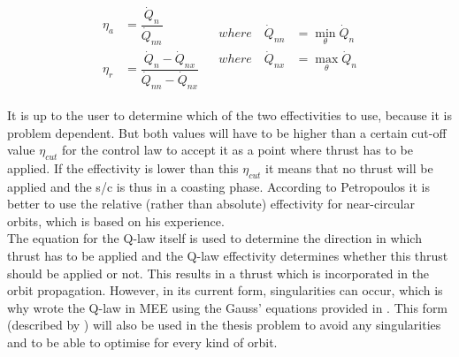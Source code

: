 



\begin{align} \label{eq:effect}
\begin{split} 
\eta_{a}&=\dfrac{\dot{Q}_{n}}{\dot{Q}_{nn}}\\
\eta_{r} &= \dfrac{\dot{Q}_{n}-\dot{Q}_{nx}}{\dot{Q}_{nn}-\dot{Q}_{nx}}
\end{split} 
&
\begin{split}
where \quad \dot{Q}_{nn}&=\displaystyle\min_{\theta}\dot{Q}_{n}\\
where \quad \dot{Q}_{nx} &= \displaystyle\max_{\theta}\dot{Q}_{n}
\end{split}
\end{align}


It is up to the user to determine which of the two effectivities to use, because it is problem dependent. But both values will have to be higher than a certain cut-off value $\eta_{cut}$ for the control law to accept it as a point where thrust has to be applied. If the effectivity is lower than this $\eta_{cut}$ it means that no thrust will be applied and the \ac{s/c} is thus in a coasting phase. According to Petropoulos it is better to use the relative (rather than absolute) effectivity for near-circular orbits, which is based on his experience.\\
The equation for the Q-law itself is used to determine the direction in which thrust has to be applied and the Q-law effectivity determines whether this thrust should be applied or not. This results in a thrust which is incorporated in the orbit propagation. However, in its current form, singularities can occur, which is why \cite{gebbett2014multi} wrote the Q-law in \ac{MEE} using the Gauss' equations provided in .  This form (described by \cite{gebbett2014multi}) will also be used in the thesis problem to avoid any singularities and to be able to optimise for every kind of orbit.\\

